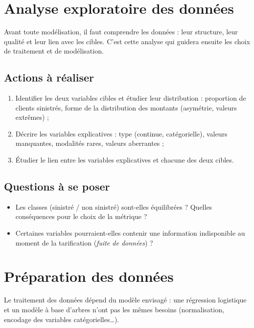 \documentclass[a4paper,11pt]{article}
\begin{document}
	\section{Analyse exploratoire des données}
	
	Avant toute modélisation, il faut comprendre les données : leur structure, leur qualité et leur lien avec les cibles. C'est cette analyse qui guidera ensuite les choix de traitement et de modélisation.
	
	\subsection*{Actions à réaliser}
	\begin{enumerate}
		\item Identifier les deux variables cibles et étudier leur distribution : proportion de clients sinistrés, forme de la distribution des montants (asymétrie, valeurs extrêmes) ;
		\item Décrire les variables explicatives : type (continue, catégorielle), valeurs manquantes, modalités rares, valeurs aberrantes ;
		\item Étudier le lien entre les variables explicatives et chacune des deux cibles.
	\end{enumerate}
	
	\subsection*{Questions à se poser}
	\begin{itemize}
		\item Les classes (sinistré / non sinistré) sont-elles équilibrées ? Quelles conséquences pour le choix de la métrique ?
		\item Certaines variables pourraient-elles contenir une information indisponible au moment de la tarification (\emph{fuite de données}) ?
	\end{itemize}
	
	\section{Préparation des données}
	
	Le traitement des données dépend du modèle envisagé : une régression logistique et un modèle à base d'arbres n'ont pas les mêmes besoins (normalisation, encodage des variables catégorielles\dots).
	
\end{document}
